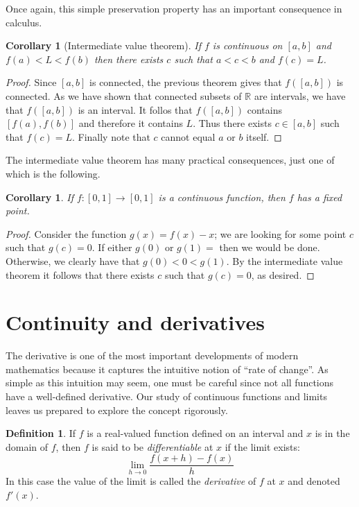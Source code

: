 \documentclass[11pt,oneside]{amsbook}
\newcommand{\RR}{\mathbb R}
\theoremstyle{definition}
\theoremstyle{plain}
\newtheorem{cor}[thm]{Corollary}
\theoremstyle{definition}
\newtheorem{defn}[thm]{Definition}
\theoremstyle{remark}
\numberwithin{equation}{section}
\numberwithin{figure}{section}
\begin{document}
Once again, this simple preservation property has an important consequence in calculus.

\begin{cor}[Intermediate value theorem]
  If $f$ is continuous on $[a,b]$ and $f(a)<L<f(b)$ then there exists $c$ such that $a<c<b$ and $f(c)=L$.
\end{cor}

\begin{proof}
  Since $[a,b]$ is connected, the previous theorem gives that $f([a,b])$ is connected. As we have shown that connected subsets of $\RR$ are intervals, we have that $f([a,b])$ is an interval. It follos that $f([a,b])$ contains $[f(a),f(b)]$ and therefore it contains $L$. Thus there exists $c\in[a,b]$ such that $f(c)=L$. Finally note that $c$ cannot equal $a$ or $b$ itself.
\end{proof}

The intermediate value theorem has many practical consequences, just one of which is the following.

\begin{cor}
  If $f\colon[0,1]\to[0,1]$ is a continuous function, then $f$ has a fixed point.
\end{cor}

\begin{proof}
  Consider the function $g(x)=f(x)-x$; we are looking for some point $c$ such that $g(c)=0$. If either $g(0)$ or $g(1)=$ then we would be done. Otherwise, we clearly have that $g(0)<0<g(1)$. By the intermediate value theorem it follows that there exists $c$ such that $g(c)=0$, as desired.
\end{proof}

\newpage
\section{Continuity and derivatives}

The derivative is one of the most important developments of modern mathematics because it captures the intuitive notion of ``rate of change''. As simple as this intuition may seem, one must be careful since not all functions have a well-defined derivative. Our study of continuous functions and limits leaves us prepared to explore the concept rigorously.

\begin{defn}
If $f$ is a real-valued function defined on an interval and $x$ is in the domain of $f$, then $f$ is said to be \emph{differentiable} at $x$ if the limit exists:
\[\lim_{h\to0}\frac{f(x+h)-f(x)}{h}
\]
In this case the value of the limit is called the \emph{derivative} of $f$ at $x$ and denoted $f'(x)$.
\end{defn}
\end{document}

